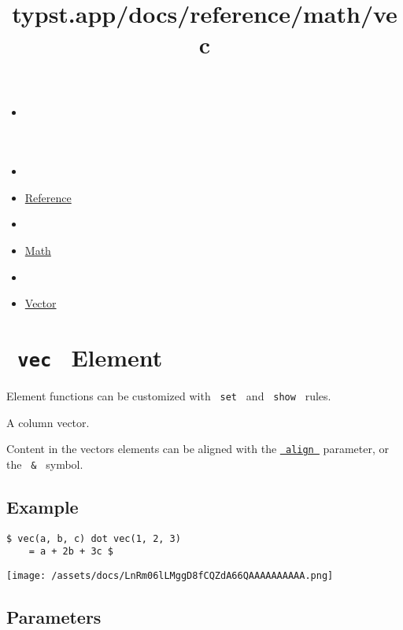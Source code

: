 \title{typst.app/docs/reference/math/vec}

\begin{itemize}
\tightlist
\item
  \href{/docs}{}
\item
  
\item
  \href{/docs/reference/}{Reference}
\item
  
\item
  \href{/docs/reference/math/}{Math}
\item
  
\item
  \href{/docs/reference/math/vec/}{Vector}
\end{itemize}

\section{\texorpdfstring{\texttt{\ vec\ } {{ Element
}}}{ vec   Element }}\label{summary}

\label{element-tooltip}
Element functions can be customized with \texttt{\ set\ } and
\texttt{\ show\ } rules.

A column vector.

Content in the vector\textquotesingle s elements can be aligned with the
\href{/docs/reference/math/vec/\#parameters-align}{\texttt{\ align\ }}
parameter, or the \texttt{\ \&\ } symbol.

\subsection{Example}\label{example}

\begin{verbatim}
$ vec(a, b, c) dot vec(1, 2, 3)
    = a + 2b + 3c $
\end{verbatim}

\texttt{[image: /assets/docs/LnRm06lLMggD8fCQZdA66QAAAAAAAAAA.png]}

\subsection{\texorpdfstring{{ Parameters
}}{ Parameters }}\label{parameters}


